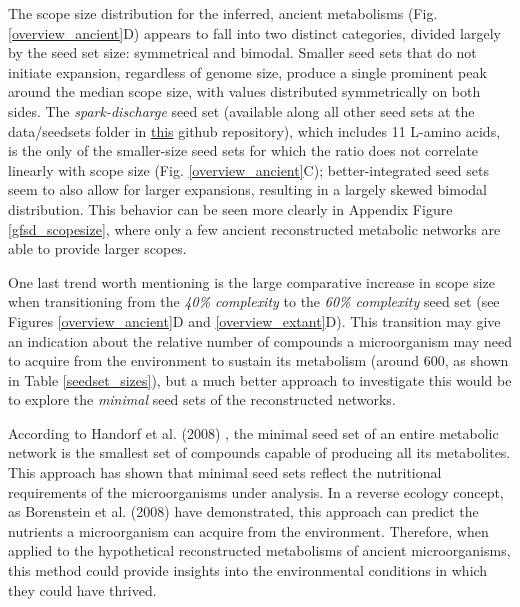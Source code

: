The scope size distribution for the inferred, ancient metabolisms (Fig. \ref{overview_ancient}D) appears to fall into two distinct categories, divided largely by the seed set size: symmetrical and bimodal. Smaller seed sets that do not initiate expansion, regardless of genome size, produce a single prominent peak around the median scope size, with values distributed symmetrically on both sides. The \textit{spark-discharge} seed set (available along all other seed sets at the data/seedsets folder in \href{https://github.com/astrademertzi/metnetexp_report}{this} github repository), which includes 11 L-amino acids, is the only of the smaller-size seed sets for which the ratio does not correlate linearly with scope size (Fig. \ref{overview_ancient}C); better-integrated seed sets seem to also allow for larger expansions, resulting in a largely skewed bimodal distribution. This behavior can be seen more clearly in Appendix Figure \ref{gfsd_scopesize}, where only a few ancient reconstructed metabolic networks are able to provide larger scopes. %

One last trend worth mentioning is the large comparative increase in scope size when transitioning from the \textit{40\% complexity} to the \textit{60\% complexity} seed set (see Figures \ref{overview_ancient}D and \ref{overview_extant}D). This transition may give an indication about the relative number of compounds a microorganism may need to acquire from the environment to sustain its metabolism (around 600, as shown in Table \ref{seedset_sizes}), but a much better approach to investigate this would be to explore the \textit{minimal} seed sets of the reconstructed networks.


According to Handorf et al. (2008) \cite{handorf2008}, the minimal seed set of an entire metabolic network is the smallest set of compounds capable of producing all its metabolites. This approach has shown that minimal seed sets reflect the nutritional requirements of the microorganisms under analysis. In a reverse ecology concept, as Borenstein et al. (2008) \cite{borenstein2008} have demonstrated, this approach can predict the nutrients a microorganism can acquire from the environment. Therefore, when applied to the hypothetical reconstructed metabolisms of ancient microorganisms, this method could provide insights into the environmental conditions in which they could have thrived.

